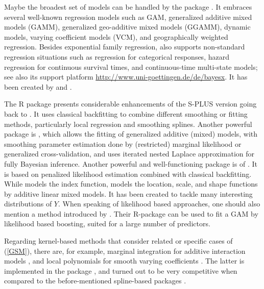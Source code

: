 Maybe the broadest set of models can be handled by the package  \citep{RPBayesX}. It embraces several well-known regression models such as GAM, generalized additive mixed models (GAMM), generalized geo-additive mixed models (GGAMM), dynamic models, varying coefficient models (VCM), and geographically weighted regression. Besides exponential family regression,  also supports non-standard regression situations such as regression for categorical responses, hazard regression for continuous survival times, and continuous-time multi-state models; see also its support platform \url{http://www.uni-goettingen.de/de/bayesx}. It has been created by \citet{BKL2005} and \citet{KBBL2008}.

The R package  \citep{RGam} presents considerable enhancements of the S-PLUS version going back to \citet{HT1990}. It uses classical backfitting to combine different smoothing or fitting methods, particularly local regression and smoothing splines. Another powerful package is  \citep{W2017}, which allows the fitting of generalized additive (mixed) models, with smoothing parameter estimation done by (restricted) marginal likelihood or generalized cross-validation, 
and uses iterated nested Laplace approximation for fully Bayesian inference.
Another powerful and well-functioning package is  of \citet{SR2007}. It is based on penalized likelihood estimation combined with classical backfitting. While  models the index function,  models the location, scale, and shape functions by additive linear mixed models. 
It has been created to tackle many interesting distributions of $Y$.  When speaking of likelihood based approaches, one should also mention a method introduced by \citet{TB2006}. Their R-package  can be used to fit a GAM by likelihood based boosting, suited for a large number of predictors.

Regarding kernel-based methods that consider related or specific cases of (\ref{GSM}), there are, for example, marginal integration \citep{LN1995} for additive interaction models \citep{STY2002}, and local polynomials for smooth varying coefficients \citep{LR2010}. The latter is implemented in the  package \citep{HR2008}, and turned out to be very competitive when compared to the before-mentioned spline-based packages \citep{ST2015}.


